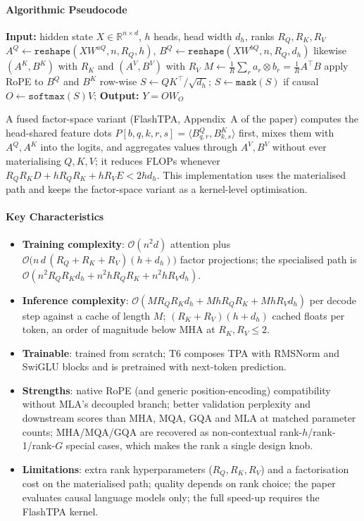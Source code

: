 \paragraph{Algorithmic Pseudocode}
\begin{algorithmic}[1]
\State \textbf{Input:} hidden state $X\in\mathbb{R}^{n\times d}$, $h$ heads, head width $d_h$, ranks $R_Q,R_K,R_V$
\State $A^Q\gets\texttt{reshape}(XW^{aQ}, n, R_Q, h)$, \quad $B^Q\gets\texttt{reshape}(XW^{bQ}, n, R_Q, d_h)$
\State likewise $(A^K,B^K)$ with $R_K$ and $(A^V,B^V)$ with $R_V$ 
    \State $M\gets \frac{1}{R}\sum_{r} a_r\otimes b_r = \frac{1}{R}A^{\top}B$ 
\EndFor
\State apply RoPE to $B^Q$ and $B^K$ row-wise 
\State $S\gets QK^{\top}/\sqrt{d_h}$; \quad $S\gets\texttt{mask}(S)$ if causal
\State $O\gets\texttt{softmax}(S)V$; \quad \textbf{Output:} $Y=OW_O$
\end{algorithmic}
A fused factor-space variant (FlashTPA, Appendix~A of the paper) computes the head-shared feature dots $P[b,q,k,r,s]=\langle B^Q_{q,r},B^K_{k,s}\rangle$ first, mixes them with $A^Q,A^K$ into the logits, and aggregates values through $A^V,B^V$ without ever materialising $Q,K,V$; it reduces FLOPs whenever $R_QR_KD + hR_QR_K + hR_VE < 2hd_h$. This implementation uses the materialised path and keeps the factor-space variant as a kernel-level optimisation.

\paragraph{Key Characteristics}
\begin{itemize}[leftmargin=*]
    \item \textbf{Training complexity}: $\mathcal{O}(n^2 d)$ attention plus $\mathcal{O}\big(n\,d\,(R_Q+R_K+R_V)(h+d_h)\big)$ factor projections; the specialised path is $\mathcal{O}(n^2R_QR_Kd_h + n^2hR_QR_K + n^2hR_Vd_h)$.
    \item \textbf{Inference complexity}: $\mathcal{O}(M R_QR_Kd_h + MhR_QR_K + MhR_Vd_h)$ per decode step against a cache of length $M$; $(R_K+R_V)(h+d_h)$ cached floats per token, an order of magnitude below MHA at $R_K,R_V\le 2$.
    \item \textbf{Trainable}: trained from scratch; T6 composes TPA with RMSNorm and SwiGLU blocks and is pretrained with next-token prediction.
    \item \textbf{Strengths}: native RoPE (and generic position-encoding) compatibility without MLA's decoupled branch; better validation perplexity and downstream scores than MHA, MQA, GQA and MLA at matched parameter counts; MHA/MQA/GQA are recovered as non-contextual rank-$h$/rank-1/rank-$G$ special cases, which makes the rank a single design knob.
    \item \textbf{Limitations}: extra rank hyperparameters ($R_Q,R_K,R_V$) and a factorisation cost on the materialised path; quality depends on rank choice; the paper evaluates causal language models only; the full speed-up requires the FlashTPA kernel.
\end{itemize}

